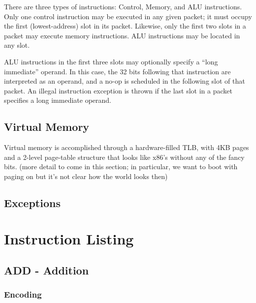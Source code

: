 \documentclass[11pt,openany]{report}
\begin{document}
There are three types of instructions: Control, Memory, and ALU instructions. Only one control instruction may be executed in any given packet; it must occupy the first (lowest-address) slot in its packet. Likewise, only the first two slots in a packet may execute memory instructions. ALU instructions may be located in any slot.

ALU instructions in the first three slots may optionally specify a ``long immediate'' operand. In this case, the 32 bits following that instruction are interpreted as an operand, and a no-op is scheduled in the following slot of that packet. An illegal instruction exception is thrown if the last slot in a packet specifies a long immediate operand.

\section{Virtual Memory}
Virtual memory is accomplished through a hardware-filled TLB, with 4KB pages and a 2-level page-table structure that looks like x86's without any of the fancy bits. (more detail to come in this section; in particular, we want to boot with paging on but it's not clear how the world looks then) 

\section{Exceptions}

\chapter{Instruction Listing}

\pagebreak
\section{ADD - Addition}

\subsection{Encoding}
\end{document}

